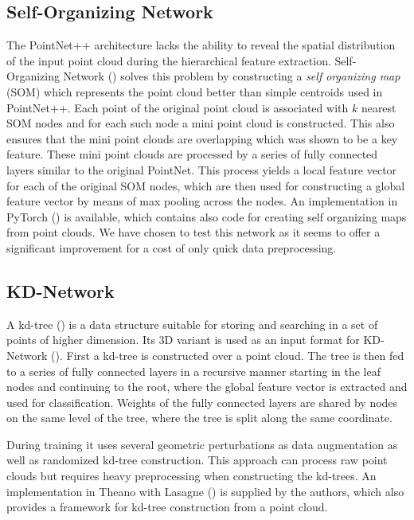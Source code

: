 \subsection{Self-Organizing Network}
The PointNet++ architecture lacks the ability to reveal the spatial distribution of the input point cloud during the hierarchical feature extraction. Self-Organizing Network (\cite{li_so-net:_2018}) solves this problem by constructing a \textit{self organizing map} (SOM) which represents the point cloud better than simple centroids used in PointNet++. Each point of the original point cloud is associated with $k$ nearest SOM nodes and for each such node a mini point cloud is constructed. This also ensures that the mini point clouds are overlapping which was shown to be a key feature. These mini point clouds are processed by a series of fully connected layers similar to the original PointNet. This process yields a local feature vector for each of the original SOM nodes, which are then used for constructing a global feature vector by means of max pooling across the nodes. An implementation in PyTorch (\cite{li_sonet_2018}) is available, which contains also code for creating self organizing maps from point clouds. We have chosen to test this network as it seems to offer a significant improvement for a cost of only quick data preprocessing.

\subsection{KD-Network}
A kd-tree (\cite{bentley_multidimensional_1975}) is a data structure suitable for storing and searching in a set of points of higher dimension. Its 3D variant is used as an input format for KD-Network (\cite{klokov_escape_2017}). First a kd-tree is constructed over a point cloud. The tree is then fed to a series of fully connected layers in a recursive manner starting in the leaf nodes and continuing to the root, where the global feature vector is extracted and used for classification. Weights of the fully connected layers are shared  by nodes on the same level of the tree, where the tree is split along the same coordinate. \par
During training it uses several geometric perturbations as data augmentation as well as randomized kd-tree construction. This approach can process raw point clouds but requires heavy preprocessing when constructing the kd-trees.
An implementation in Theano with Lasagne (\cite{klokov_kd-net_2017}) is supplied by the authors, which also provides a framework for kd-tree construction from a point cloud.

